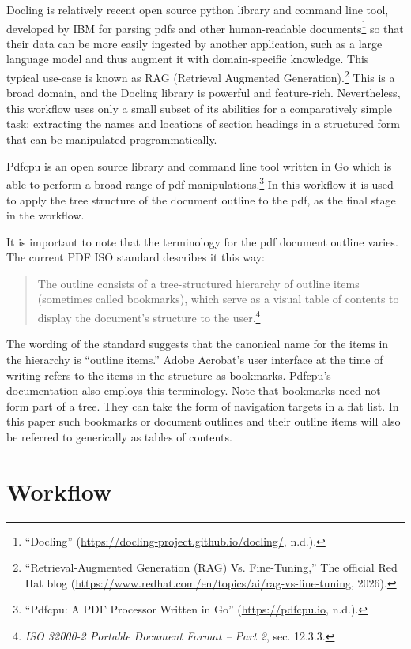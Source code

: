 \documentclass[
  letterpaper,
]{tufte-handout}
\begin{document}
Docling is relatively recent open source python library and command line
tool, developed by IBM for parsing pdfs and other human-readable
documents\footnote{{``Docling''}
  (\url{https://docling-project.github.io/docling/}, n.d.).} so that
their data can be more easily ingested by another application, such as a
large language model and thus augment it with domain-specific knowledge.
This typical use-case is known as RAG (Retrieval Augmented
Generation).\footnote{{``Retrieval-Augmented Generation (RAG) Vs.
  Fine-Tuning,''} The official Red Hat blog
  (\url{https://www.redhat.com/en/topics/ai/rag-vs-fine-tuning}, 2026).}
This is a broad domain, and the Docling library is powerful and
feature-rich. Nevertheless, this workflow uses only a small subset of
its abilities for a comparatively simple task: extracting the names and
locations of section headings in a structured form that can be
manipulated programmatically.

Pdfcpu is an open source library and command line tool written in Go
which is able to perform a broad range of pdf manipulations.\footnote{{``Pdfcpu:
  A PDF Processor Written in Go''} (\url{https://pdfcpu.io}, n.d.).} In
this workflow it is used to apply the tree structure of the document
outline to the pdf, as the final stage in the workflow.

It is important to note that the terminology for the pdf document
outline varies. The current PDF ISO standard describes it this way:

\begin{quote}
The outline consists of a tree-structured hierarchy of outline items
(sometimes called bookmarks), which serve as a visual table of contents
to display the document's structure to the user.\footnote{\emph{ISO
  32000-2 Portable Document Format -- Part 2}, sec. 12.3.3.}
\end{quote}

The wording of the standard suggests that the canonical name for the
items in the hierarchy is ``outline items.'' Adobe Acrobat's user
interface at the time of writing refers to the items in the structure as
bookmarks. Pdfcpu's documentation also employs this terminology. Note
that bookmarks need not form part of a tree. They can take the form of
navigation targets in a flat list. In this paper such bookmarks or
document outlines and their outline items will also be referred to
generically as tables of contents.

\section{Workflow}\label{workflow}
\end{document}
